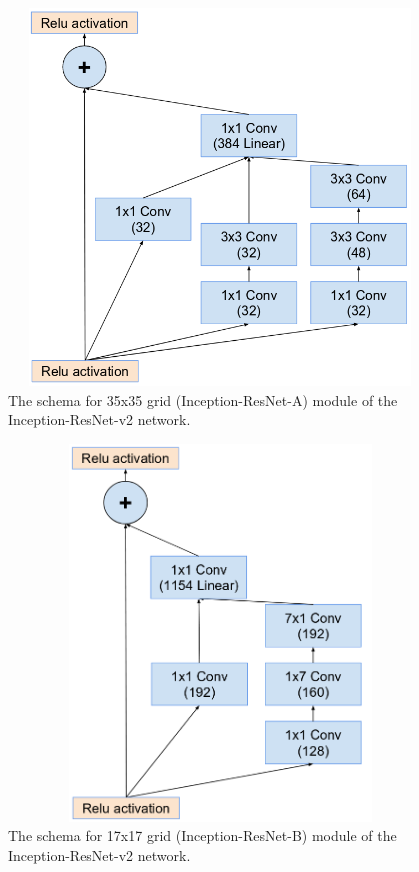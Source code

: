 \documentclass[a4paper,12pt, twoside]{NITKReport}
\begin{document}
\begin{figure}[h]
  \centering
    \includegraphics[height=10cm,width=13cm]{figure16.png}
    \caption{The  schema  for 35x35 grid  (Inception-ResNet-A) module of the Inception-ResNet-v2 network.}
    \label{16}

\end{figure}

\begin{figure}[h]
  \centering
   
    \includegraphics[height=10cm,width=13cm]{figure17.png}
    \caption{ The  schema  for 17x17 grid  (Inception-ResNet-B) module of the Inception-ResNet-v2 network.}
    \label{17}
 
 \end{figure}
 
\end{document}
